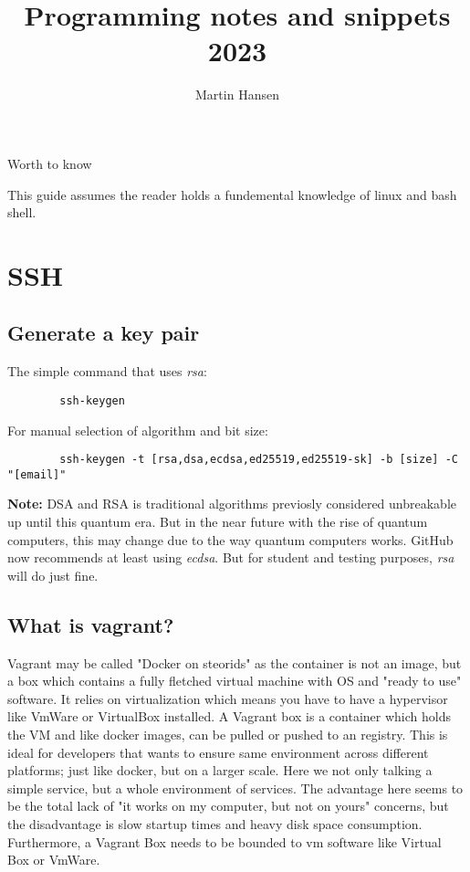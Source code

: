 \documentclass{article}
\author{Martin Hansen}
\title{Programming notes and snippets 2023}
\newcommand{\centeredHeadline}[1]{\begin{center}\large #1\end{center}}
\newcommand{\note}{\textbf{Note:} }
\begin{document}
	
	\frenchspacing
	\maketitle
	
	\pagebreak
	
	\centeredHeadline{Worth to know}
	
	This guide assumes the reader holds a fundemental knowledge of linux and bash shell.  
	
	\pagebreak
	
	\tableofcontents
	
	\pagebreak
	
	\section{SSH}
	\subsection{Generate a key pair}
	The simple command that uses \textit{rsa}:
	\begin{lstlisting}
		ssh-keygen
	\end{lstlisting}
	
	For manual selection of algorithm and bit size:
	
	\begin{lstlisting}
		ssh-keygen -t [rsa,dsa,ecdsa,ed25519,ed25519-sk] -b [size] -C "[email]" 
	\end{lstlisting}

	\note DSA and RSA is traditional algorithms previosly considered unbreakable  up until this quantum era. But in the near future
	with the rise of quantum computers, this may change due to the way quantum computers works. GitHub now recommends at least using \textit{ecdsa}. But for student and testing purposes, \textit{rsa} will do just fine.
	
	\subsection{What is vagrant?}
	
	Vagrant may be called "Docker on steorids" as the container is not an image, but a box which contains a fully fletched virtual machine with OS and "ready to use" software. It relies on virtualization which means you have to have a hypervisor like VmWare or VirtualBox installed. A Vagrant box is a container which holds the VM and like docker images, can be pulled or pushed to an registry. This is ideal for developers that wants to ensure same environment across different platforms; just like docker, but on a larger scale. Here we not only talking a simple service, but a whole environment of services. The advantage here seems to be the total lack of "it works on my computer, but not on  yours" concerns, but the disadvantage is slow startup times and heavy disk space consumption. Furthermore, a Vagrant Box needs to be bounded to vm software like Virtual Box or VmWare.
	
\end{document}
